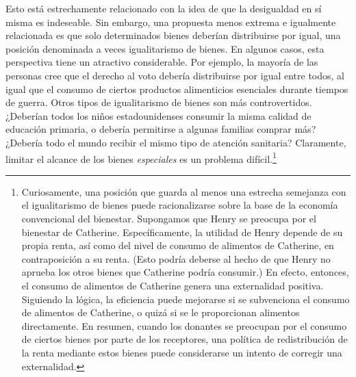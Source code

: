 \documentclass[10pt,a4paper]{article}
\begin{document}
Esto está estrechamente relacionado con la idea de que la desigualdad en sí misma es indeseable. Sin embargo, una propuesta menos extrema e igualmente relacionada es que solo determinados bienes deberían distribuirse por igual, una posición denominada a veces igualitarismo de bienes. En algunos casos, esta perspectiva tiene un atractivo considerable. Por ejemplo, la mayoría de las personas cree que el derecho al voto debería distribuirse por igual entre todos, al igual que el consumo de ciertos productos alimenticios esenciales durante tiempos de guerra. Otros tipos de igualitarismo de bienes son más controvertidos. ¿Deberían todos los niños estadounidenses consumir la misma calidad de educación primaria, o debería permitirse a algunas familias comprar más? ¿Debería todo el mundo recibir el mismo tipo de atención sanitaria? Claramente, limitar el alcance de los bienes \textit{especiales} es un problema difícil.\footnote{%
    Curiosamente, una posición que guarda al menos una estrecha semejanza con el igualitarismo de bienes puede racionalizarse sobre la base de la economía convencional del bienestar. Supongamos que Henry se preocupa por el bienestar de Catherine. Específicamente, la utilidad de Henry depende de su propia renta, así como del nivel de consumo de alimentos de Catherine, en contraposición a su renta. (Esto podría deberse al hecho de que Henry no aprueba los otros bienes que Catherine podría consumir.) En efecto, entonces, el consumo de alimentos de Catherine genera una externalidad positiva. Siguiendo la lógica, la eficiencia puede mejorarse si se subvenciona el consumo de alimentos de Catherine, o quizá si se le proporcionan alimentos directamente. En resumen, cuando los donantes se preocupan por el consumo de ciertos bienes por parte de los receptores, una política de redistribución de la renta mediante estos bienes puede considerarse un intento de corregir una externalidad.
}
\end{document}
